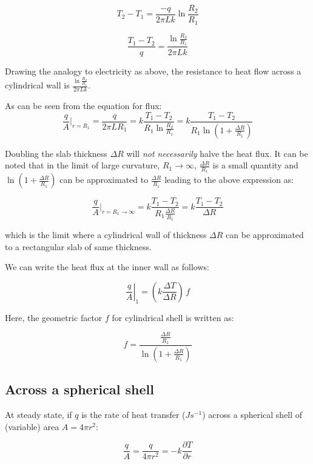 $$ T_2 - T_1 = \frac{-q}{2\pi L k} \ln{\frac{R_2}{R_1}}$$

\begin{equation}
\boxed{
  \frac{T_1 - T_2}{q} = \frac{ \ln{\frac{R_2}{R_1}} } {2\pi L k}
}
\end{equation}

Drawing the analogy to electricity as above, the resistance to heat flow across
a cylindrical wall is $\frac{\ln{\frac{R_2}{R_1} }} {2\pi L k}$.

As can be seen from the equation for flux:
$$\frac{q}{A}|_{r=R_1} = \frac{q}{2\pi L R_1} = k \frac{T_1 - T_2}{R_1
\ln{\frac{R_2}{R_1}}} = k \frac{T_1 - T_2}{R_1 \ln{(1+ \frac{\Delta R}{R_1})}}
$$

Doubling the slab thickness $\Delta R$ will \textit{not necessarily} halve the
heat flux. It can be noted that in the limit of large curvature, $R_1
\rightarrow \infty$, $\frac{\Delta R}{R_1}$ is a small quantity and $\ln{(1+
\frac{\Delta R}{R_1})}$ can be approximated to $\frac{\Delta R}{R_1}$ leading to
the above expression as:

$$\frac{q}{A}|_{r=R_1 \rightarrow \infty} = k \frac{T_1 - T_2}{R_1 \frac{\Delta
R}{R_1}} = k \frac{T_1 - T_2}{ \Delta R} $$

which is the limit where a cylindrical wall of thickness $\Delta R$ can be
approximated to a rectangular slab of same thickness.

We can write the heat flux at the inner wall as follows:

\begin{equation}
	\left. \frac{q}{A} \right|_{1} = \left( k \frac{\Delta T}{\Delta R} \right) \, f 
\end{equation}

Here, the geometric factor $f$ for cylindrical shell is written as:

\begin{equation}
	f = \frac{ \frac{\Delta R}{R_1}}{\ln\left(1 + \frac{\Delta R}{R_1}\right)}
\end{equation}


\subsection{Across a spherical shell}

At steady state, if $q$ is the rate of heat transfer ($Js^{-1}$) across a
spherical shell of (variable) area $A=4\pi r^2$:

$$ \frac{q}{A} = \frac{q}{4\pi r^2} = -k \frac{\partial T}{\partial r} $$

